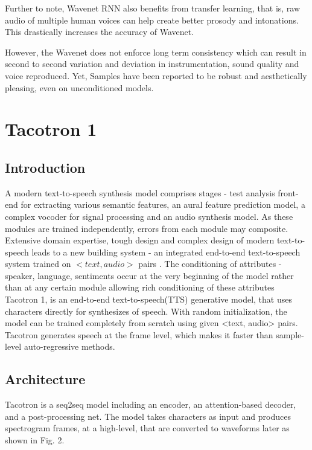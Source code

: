 \documentclass[runningheads]{llncs}
\begin{document}
Further to note,  Wavenet RNN also benefits from transfer learning, that is, raw audio of multiple human voices can help create better prosody and intonations. This drastically increases the accuracy of Wavenet.

However, the Wavenet does not enforce long term consistency which can result in second to second variation and deviation in instrumentation, sound quality and voice reproduced.
Yet,  Samples have been reported to be robust and aesthetically pleasing, even on unconditioned models.


\section{Tacotron 1}
\subsection{Introduction}
A modern text-to-speech synthesis model comprises stages - test analysis front-end for extracting various semantic features, an aural feature prediction model, a complex vocoder for signal processing and an audio synthesis model. As these modules are trained independently, errors from each module may composite. Extensive domain expertise, tough design and complex design of modern text-to-speech leads to a new building system - an integrated end-to-end text-to-speech system trained on $<text, audio>$ pairs \cite{ref_paper3}. The conditioning of attributes - speaker, language, sentiments occur at the very beginning of the model rather than at any certain module allowing rich conditioning of these attributes
\\
Tacotron 1, is an end-to-end text-to-speech(TTS) generative model, that uses characters directly for synthesizes of speech. With random initialization, the model can be trained completely from scratch using given <text, audio> pairs. Tacotron generates speech at the frame level, which makes it faster than sample-level auto-regressive methods.  

\subsection{Architecture}
Tacotron is a seq2seq model including an encoder, an attention-based decoder, and a post-processing net. The model takes characters as input and produces spectrogram frames, at a high-level, that are converted to waveforms later as shown in Fig. 2.
\end{document}
